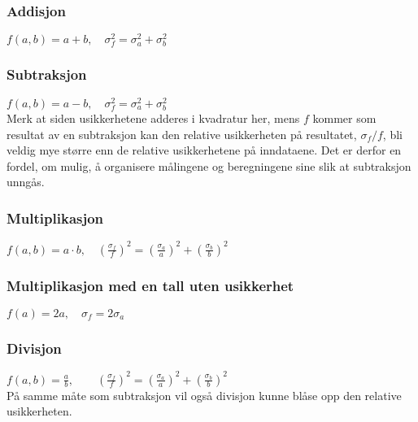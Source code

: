 \documentclass[a4paper,norsk,12pt]{book}
\begin{document}
\subsubsection*{Addisjon}
$f(a,b) = a + b,\quad	\sigma_f^2 = \sigma_a^2 + \sigma_b^2$
\subsubsection*{Subtraksjon}
$f(a,b) = a - b, \quad	\sigma_f^2 = \sigma_a^2 + \sigma_b^2$ \\
Merk at siden usikkerhetene adderes i kvadratur her, mens $f$ kommer som resultat av en subtraksjon kan den relative usikkerheten på resultatet, $\sigma_f/f$, bli veldig mye større enn de relative usikkerhetene på inndataene. Det er derfor en fordel, om mulig, å organisere målingene og beregningene sine slik at subtraksjon unngås.
\subsubsection*{Multiplikasjon}
$f(a,b) = a\cdot b, 
\quad  \left(\frac{\sigma_f}{f}\right)^2 = \left(\frac{\sigma_a}{a}\right)^2 + \left(\frac{\sigma_b}{b}\right)^2$
\subsubsection*{Multiplikasjon med en tall uten usikkerhet}
$f(a) = 2a, \quad \sigma_f = 2\sigma_a$
\subsubsection*{Divisjon}
$f(a,b) = \frac{a}{b}, \quad 
\quad  \left(\frac{\sigma_f}{f}\right)^2 = \left(\frac{\sigma_a}{a}\right)^2 + \left(\frac{\sigma_b}{b}\right)^2$\\
På samme måte som subtraksjon vil også divisjon kunne blåse opp den relative usikkerheten.
\end{document}
